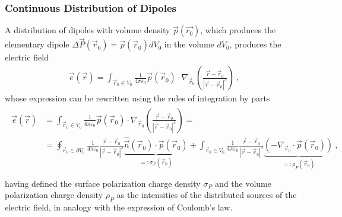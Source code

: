 \documentclass[letterpaper,10pt,english]{jupyterBook}
\begin{document}
\subsubsection{Continuous Distribution of Dipoles}
\label{\detokenize{ch/principles-matter-polarization:continuous-distribution-of-dipoles}}
\sphinxAtStartPar
A distribution of dipoles with volume density \(\vec{p}(\vec{r_0})\), which produces the elementary dipole \(\Delta \vec{P}(\vec{r}_0) = \vec{p}(\vec{r}_0) dV_0\) in the volume \(d V_0\), produces the electric field
\begin{equation*}
\begin{split}\vec{e}(\vec{r}) = \int_{\vec{r}_0 \in V_0} \frac{1}{4 \pi \varepsilon_0} \vec{p}(\vec{r}_0) \cdot \nabla_{\vec{r}_0}  \left( \frac{\vec{r} - \vec{r}_0}{|\vec{r} - \vec{r}_0|^3} \right) \ , \end{split}
\end{equation*}
\sphinxAtStartPar
whose expression can be rewritten using the rules of integration by parts
\begin{equation*}
\begin{split}\begin{aligned}
\vec{e}(\vec{r})
  & = \int_{\vec{r}_0 \in V_0} \frac{1}{4 \pi \varepsilon_0} \vec{p}(\vec{r}_0) \cdot \nabla_{\vec{r}_0}  \left( \frac{\vec{r} - \vec{r}_0}{|\vec{r} - \vec{r}_0|^3} \right) = \\
  & = \oint_{\vec{r}_0 \in \partial V_0} \frac{1}{4 \pi \varepsilon_0}  \frac{\vec{r} - \vec{r}_0}{|\vec{r} - \vec{r}_0|^3} \underbrace{ \hat{\vec{n}}(\vec{r}_0) \cdot \vec{p}(\vec{r}_0) }_{ =: \sigma_P(\vec{r}_0)}  + \int_{\vec{r}_0 \in V_0} \frac{1}{4 \pi \varepsilon_0} \frac{\vec{r} - \vec{r}_0}{|\vec{r} - \vec{r}_0|^3} \underbrace{ \left( - \nabla_{\vec{r}_0} \cdot \vec{p}(\vec{r}_0) \right)}_{ =: \rho_P(\vec{r}_0) } \ , \\
\end{aligned}\end{split}
\end{equation*}
\sphinxAtStartPar
having defined the surface polarization charge density \(\sigma_P\) and the volume polarization charge density \(\rho_P\) as the intensities of the distributed sources of the electric field, in analogy with the expression of Coulomb’s law.
\end{document}
